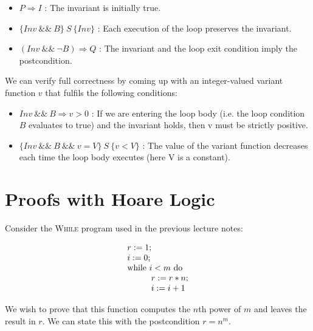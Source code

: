 \documentclass[11pt]{article}
\begin{document}
    \begin{itemize}
        \item $P \Rightarrow I$ : The invariant is initially true.

        \item $\{ Inv ~\&\&~ B \} ~S~ \{Inv\}$ : Each execution of the loop preserves the invariant.

        \item $(Inv ~\&\&~ \lnot B) \Rightarrow Q$ : The invariant and the loop exit condition imply the postcondition.
    \end{itemize}

    We can verify full correctness by coming up with an integer-valued
    variant function $v$ that fulfils the following conditions:

    \begin{itemize}

        \item $Inv ~\&\&~ B \Rightarrow v > 0$ : If we are entering the loop
        body (i.e. the loop condition $B$ evaluates to true) and the invariant
        holds, then v must be strictly positive.

        \item $\{ Inv ~\&\&~ B ~\&\&~ v = V\} ~S~ \{v < V\}$ : The value of the variant function decreases each time the loop body executes (here V is a constant).

    \end{itemize}


    \section{Proofs with Hoare Logic}

    Consider the \textsc{While} program used in the previous lecture notes:

    \[
        \begin{array}{l}
            r := 1;\\
            i := 0;\\
            \mbox{while}~ i<m ~\mbox{do} \\
            \hspace{1cm} r:=r*n; \\
            \hspace{1cm} i:=i+1
        \end{array}
    \]

    We wish to prove that this function computes the $n$th power of $m$
    and leaves the result in $r$. We can state this with the
    postcondition $r=n^m$.
\end{document}
